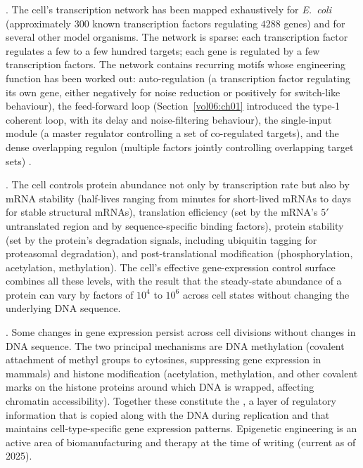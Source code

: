 . The cell's transcription network has
been mapped exhaustively for \emph{E.~coli} (approximately $300$
known transcription factors regulating $4288$ genes) and for several
other model organisms. The network is sparse: each transcription
factor regulates a few to a few hundred targets; each gene is
regulated by a few transcription factors. The network contains
recurring motifs whose engineering function has been worked out:
auto-regulation (a transcription factor regulating its own gene,
either negatively for noise reduction or positively for switch-like
behaviour), the feed-forward loop (Section~\ref{vol06:ch01} introduced
the type-1 coherent loop, with its delay and noise-filtering behaviour),
the single-input module (a master regulator controlling a set of
co-regulated targets), and the dense overlapping regulon (multiple
factors jointly controlling overlapping target sets)
\cite[ch.~6]{text:alon-systems-biology}.

. The cell controls protein
abundance not only by transcription rate but also by mRNA stability
(half-lives ranging from minutes for short-lived mRNAs to days for
stable structural mRNAs), translation efficiency (set by the mRNA's
$5'$ untranslated region and by sequence-specific binding factors),
protein stability (set by the protein's degradation signals,
including ubiquitin tagging for proteasomal degradation), and
post-translational modification (phosphorylation, acetylation,
methylation). The cell's effective gene-expression control surface
combines all these levels, with the result that the steady-state
abundance of a protein can vary by factors of $10^4$ to $10^6$ across
cell states without changing the underlying DNA sequence.

. Some changes in gene expression
persist across cell divisions without changes in DNA sequence. The
two principal mechanisms are DNA methylation (covalent attachment of
methyl groups to cytosines, suppressing gene expression in mammals)
and histone modification (acetylation, methylation, and other
covalent marks on the histone proteins around which DNA is wrapped,
affecting chromatin accessibility). Together these constitute the
, a layer of regulatory information that is
copied along with the DNA during replication and that maintains
cell-type-specific gene expression patterns. Epigenetic engineering
is an active area of biomanufacturing and therapy at the time of
writing (current as of 2025).

